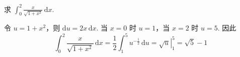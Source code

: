 \begin{problem}
求 \(\int_0^2\frac{x}{\sqrt{1+x^2}}\,\mathrm{d}x\).
\end{problem}

\begin{solution}
令 \(u=1+x^2\)，则 \(\mathrm{d}u=2x\,\mathrm{d}x\). 当 \(x=0\) 时 \(u=1\)，当 \(x=2\) 时 \(u=5\). 因此
\[
\int_0^2\frac{x}{\sqrt{1+x^2}}\,\mathrm{d}x
=\frac{1}{2}\int_1^5u^{-\frac{1}{2}}\,\mathrm{d}u
=\left.\sqrt{u}\right|_1^5
=\sqrt{5}-1
\]
\end{solution}
